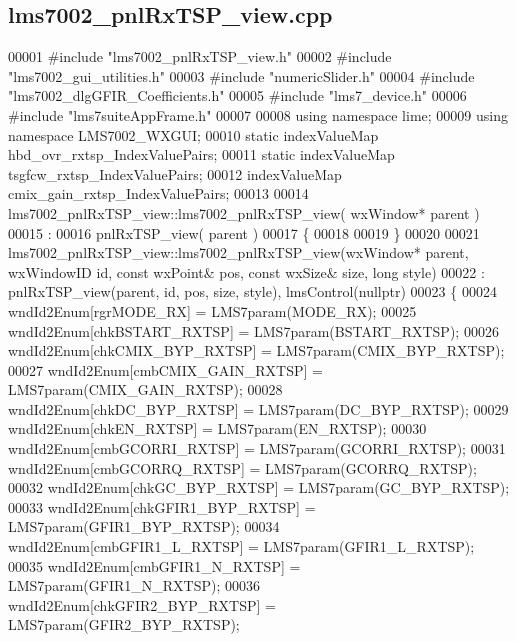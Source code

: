 \subsection{lms7002\+\_\+pnl\+Rx\+T\+S\+P\+\_\+view.\+cpp}
\label{lms7002__pnlRxTSP__view_8cpp_source}

\begin{DoxyCode}
00001 \textcolor{preprocessor}{#include "lms7002_pnlRxTSP_view.h"}
00002 \textcolor{preprocessor}{#include "lms7002_gui_utilities.h"}
00003 \textcolor{preprocessor}{#include "numericSlider.h"}
00004 \textcolor{preprocessor}{#include "lms7002_dlgGFIR_Coefficients.h"}
00005 \textcolor{preprocessor}{#include "lms7_device.h"}
00006 \textcolor{preprocessor}{#include "lms7suiteAppFrame.h"}
00007 
00008 \textcolor{keyword}{using namespace }lime;
00009 \textcolor{keyword}{using namespace }LMS7002_WXGUI;
00010 \textcolor{keyword}{static} indexValueMap hbd_ovr_rxtsp_IndexValuePairs;
00011 \textcolor{keyword}{static} indexValueMap tsgfcw_rxtsp_IndexValuePairs;
00012 indexValueMap cmix_gain_rxtsp_IndexValuePairs;
00013 
00014 lms7002_pnlRxTSP_view::lms7002_pnlRxTSP_view( wxWindow* parent )
00015 :
00016 pnlRxTSP_view( parent )
00017 \{
00018 
00019 \}
00020 
00021 lms7002_pnlRxTSP_view::lms7002_pnlRxTSP_view(wxWindow* parent, wxWindowID \textcolor{keywordtype}{id}, \textcolor{keyword}{const} wxPoint& pos, \textcolor{keyword}{const} 
      wxSize& size, \textcolor{keywordtype}{long} style)
00022     : pnlRxTSP_view(parent, id, pos, size, style), lmsControl(nullptr)
00023 \{
00024     wndId2Enum[rgrMODE_RX] = LMS7param(MODE_RX);
00025     wndId2Enum[chkBSTART_RXTSP] = LMS7param(BSTART_RXTSP);
00026     wndId2Enum[chkCMIX_BYP_RXTSP] = LMS7param(CMIX_BYP_RXTSP);
00027     wndId2Enum[cmbCMIX_GAIN_RXTSP] = LMS7param(CMIX_GAIN_RXTSP);
00028     wndId2Enum[chkDC_BYP_RXTSP] = LMS7param(DC_BYP_RXTSP);
00029     wndId2Enum[chkEN_RXTSP] = LMS7param(EN_RXTSP);
00030     wndId2Enum[cmbGCORRI_RXTSP] = LMS7param(GCORRI_RXTSP);
00031     wndId2Enum[cmbGCORRQ_RXTSP] = LMS7param(GCORRQ_RXTSP);
00032     wndId2Enum[chkGC_BYP_RXTSP] = LMS7param(GC_BYP_RXTSP);
00033     wndId2Enum[chkGFIR1_BYP_RXTSP] = LMS7param(GFIR1_BYP_RXTSP);
00034     wndId2Enum[cmbGFIR1_L_RXTSP] = LMS7param(GFIR1_L_RXTSP);
00035     wndId2Enum[cmbGFIR1_N_RXTSP] = LMS7param(GFIR1_N_RXTSP);
00036     wndId2Enum[chkGFIR2_BYP_RXTSP] = LMS7param(GFIR2_BYP_RXTSP);

\end{DoxyCode}
